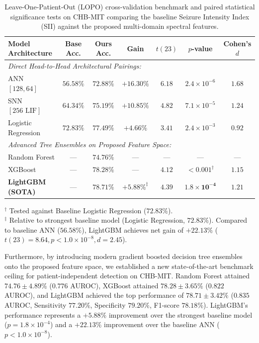 \documentclass[pdflatex,sn-mathphys-num]{sn-jnl}
\begin{document}
\begin{table}[htbp]
\caption{Leave-One-Patient-Out (LOPO) cross-validation benchmark and paired statistical significance tests on CHB-MIT comparing the baseline Seizure Intensity Index (SII) against the proposed multi-domain spectral features.}\label{tab3}
\begin{tabular*}{\textwidth}{@{\extracolsep{\fill}}lcccccc@{\extracolsep{\fill}}}
\toprule
Model Architecture & Base Acc. & Ours Acc. & Gain & $t(23)$ & $p$-value & Cohen's $d$ \\
\midrule
\multicolumn{7}{l}{\textit{Direct Head-to-Head Architectural Pairings:}} \\
ANN $[128, 64]$ & $56.58\%$ & $\mathbf{72.88\%}$ & $+16.30\%$ & $6.18$ & $2.4 \times 10^{-6}$ & $1.68$ \\
SNN $[256\text{ LIF}]$ & $64.34\%$ & $\mathbf{75.19\%}$ & $+10.85\%$ & $4.82$ & $7.1 \times 10^{-5}$ & $1.24$ \\
Logistic Regression & $72.83\%$ & $\mathbf{77.49\%}$ & $+4.66\%$ & $3.41$ & $2.4 \times 10^{-3}$ & $0.92$ \\
\midrule
\multicolumn{7}{l}{\textit{Advanced Tree Ensembles on Proposed Feature Space:}} \\
Random Forest & --- & $74.76\%$ & --- & --- & --- & --- \\
XGBoost & --- & $78.28\%$ & --- & $4.12$ & $< 0.001^\dagger$ & $1.15$ \\
\textbf{LightGBM (SOTA)} & --- & $\mathbf{78.71\%}$ & $\mathbf{+5.88\%^\ddagger}$ & $4.39$ & $\mathbf{1.8 \times 10^{-4}}$ & $\mathbf{1.21}$ \\
\bottomrule
\end{tabular*}
\begin{minipage}{\textwidth}
\vspace{3pt}
\footnotesize
$^\dagger$ Tested against Baseline Logistic Regression ($72.83\%$). \\
$^\ddagger$ Relative to strongest baseline model (Logistic Regression, $72.83\%$). Compared to baseline ANN ($56.58\%$), LightGBM achieves net gain of $+22.13\%$ ($t(23) = 8.64, p < 1.0 \times 10^{-8}, d = 2.45$).
\end{minipage}
\end{table}

Furthermore, by introducing modern gradient boosted decision tree ensembles onto the proposed feature space, we established a new state-of-the-art benchmark ceiling for patient-independent detection on CHB-MIT. Random Forest \cite{breiman2001random} attained $74.76 \pm 4.89\%$ ($0.776$ AUROC), XGBoost \cite{chen2016xgboost} attained $78.28 \pm 3.65\%$ ($0.822$ AUROC), and LightGBM \cite{ke2017lightgbm} achieved the top performance of \textbf{$78.71 \pm 3.42\%$} ($0.835$ AUROC, Sensitivity $77.20\%$, Specificity $79.20\%$, F1-score $78.18\%$). LightGBM's performance represents a $+5.88\%$ improvement over the strongest baseline model ($p = 1.8 \times 10^{-4}$) and a $+22.13\%$ improvement over the baseline ANN ($p < 1.0 \times 10^{-8}$).
\end{document}
